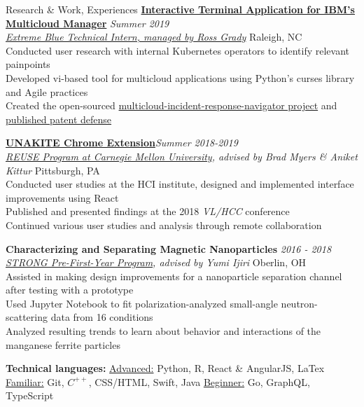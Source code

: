 \documentclass{resume}
\begin{document}
\begin{rSection}{Research \& Work, Experiences}
\href{https://github.com/IBM/multicloud-incident-response-navigator}{\bf Interactive Terminal Application for IBM's Multicloud Manager} \hfill  {\em Summer 2019} \\
\href{https://www.ibm.com/employment/extremeblue/index.html}{\em Extreme Blue Technical Intern, managed by Ross Grady} \hfill { Raleigh, NC} \\
{Conducted user research with internal Kubernetes operators to identify relevant painpoints} \\
Developed vi-based tool for multicloud applications using Python's curses library and Agile practices \\
{Created the open-sourced \href{https://github.com/IBM/multicloud-incident-response-navigator}{multicloud-incident-response-navigator project}} and \href{https://priorart.ip.com/IPCOM/000262660}{published patent defense}

{\bf \href{https://unakite.info/}{UNAKITE Chrome Extension}}\hfill {\em Summer 2018-2019} \\
{\em \href{https://www.cmu.edu/scs/isr/reuse/}{REUSE Program at Carnegie Mellon University}, advised by Brad Myers \& Aniket Kittur} \hfill { Pittsburgh, PA}\\
Conducted user studies at the HCI institute, designed and implemented interface improvements using React \\
Published and presented findings at the 2018 {\em VL/HCC} conference \\
Continued various user studies and analysis through remote collaboration

{\bf Characterizing and Separating Magnetic Nanoparticles } \hfill {\em 2016 - 2018}\\
{\em \href{https://www.oberlin.edu/undergraduate-research/programs/strong}{STRONG Pre-First-Year Program}, advised by Yumi Ijiri } \hfill { Oberlin, OH}\\
Assisted in making design improvements for a nanoparticle separation channel after testing with a prototype \\
Used Jupyter Notebook to fit polarization-analyzed small-angle neutron-scattering data from 16 conditions \\
Analyzed resulting trends to learn about behavior and interactions of the manganese ferrite particles 

\textbf{Technical languages:} \hspace{11em} {\underline{Advanced:} Python, R, React \& AngularJS, LaTex} \\
{\underline{Familiar:} Git, {$C^{++}$}, CSS/HTML, Swift, Java} \hspace{11em} {\underline{Beginner:} Go, GraphQL, TypeScript} 

\end{rSection}
\end{document}
